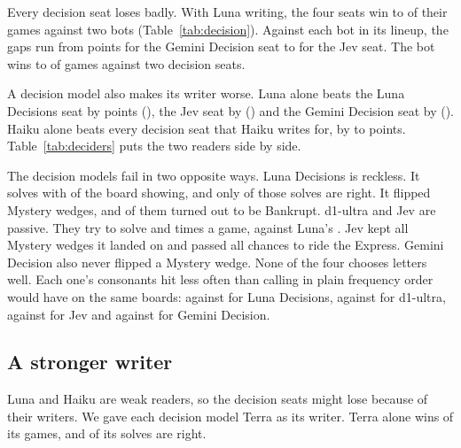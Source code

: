 Every decision seat loses badly. With Luna writing, the four seats win \DoneWin{} to \GemDecWin{} of their games against two bots (Table~\ref{tab:decision}). Against each bot in its lineup, the gaps run from \GemDecVsBots{} points for the Gemini Decision seat to \JevVsBots{} for the Jev seat. The bot wins \BotVsGemDecs{} to \BotVsJevs{} of games against two decision seats.

A decision model also makes its writer worse. Luna alone beats the Luna Decisions seat by \PairLunaAloneMinusTheLunaDecisionsSeat{} points (\PairLunaAloneMinusTheLunaDecisionsSeatCI), the Jev seat by \PairLunaAloneMinusTheJevSeat{} (\PairLunaAloneMinusTheJevSeatCI) and the Gemini Decision seat by \PairLunaAloneMinusTheGeminiDecisionSeat{} (\PairLunaAloneMinusTheGeminiDecisionSeatCI). Haiku alone beats every decision seat that Haiku writes for, by \PairHaikuAloneMinusTheGeminiDecisionSeatWithHaikuWriting{} to \PairHaikuAloneMinusTheJevSeatWithHaikuWriting{} points. Table~\ref{tab:deciders} puts the two readers side by side.

The decision models fail in two opposite ways. Luna Decisions is reckless. It solves with \LunaDecShown{} of the board showing, and only \LunaDecAcc{} of those solves are right. It flipped \LunaDecMysteryFlip{} Mystery wedges, and \LunaDecMysteryBankrupt{} of them turned out to be Bankrupt. d1-ultra and Jev are passive. They try to solve \DoneTries{} and \JevTries{} times a game, against Luna's \LunaTries{}. Jev kept all \JevMysteryKeep{} Mystery wedges it landed on and passed all \JevExpressPass{} chances to ride the Express. Gemini Decision also never flipped a Mystery wedge. None of the four chooses letters well. Each one's consonants hit less often than calling in plain frequency order would have on the same boards: \LunaDecConsHit{} against \LunaDecConsRule{} for Luna Decisions, \DoneConsHit{} against \DoneConsRule{} for d1-ultra, \JevConsHit{} against \JevConsRule{} for Jev and \GemDecConsHit{} against \GemDecConsRule{} for Gemini Decision.

\subsection{A stronger writer}

Luna and Haiku are weak readers, so the decision seats might lose because of their writers. We gave each decision model Terra as its writer. Terra alone wins \TerraWin{} of its games, and \TerraAcc{} of its solves are right.


